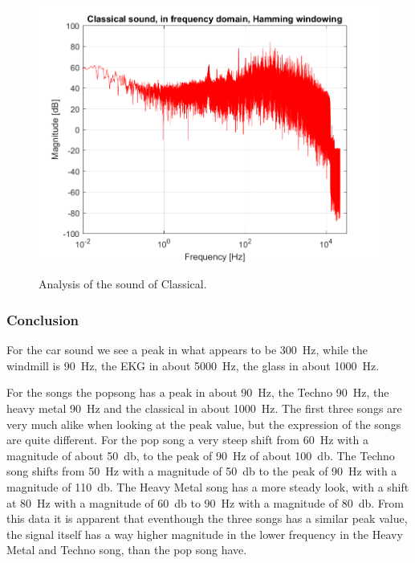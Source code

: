 \begin{figure}[htb!]
	{\includegraphics[width=0.45\linewidth]{code/Classical_figure5.png}}
	\caption{Analysis of the sound of Classical.}\label{fig:klassisk}
\end{figure}

\subsubsection{Conclusion}

For the car sound we see a peak in what appears to be \SI{300}{\hertz}, while the windmill is \SI{90}{\hertz}, the EKG in about \SI{5000}{\hertz}, the glass in about \SI{1000}{\hertz}. 

For the songs the popsong has a peak in about \SI{90}{\hertz}, the Techno \SI{90}{\hertz}, the heavy metal \SI{90}{\hertz} and the classical in about \SI{1000}{\hertz}. The first three songs are very much alike when looking at the peak value, but the expression of the songs are quite different. For the pop song a very steep shift from \SI{60}{\hertz} with a magnitude of about \SI{50}{\decibel}, to the peak of \SI{90}{\hertz} of about \SI{100}{\decibel}. The Techno song shifts from \SI{50}{\hertz} with a magnitude of \SI{50}{\decibel} to the peak of \SI{90}{\hertz} with a magnitude of \SI{110}{\decibel}. The Heavy Metal song has a more steady look, with a shift at \SI{80}{\hertz} with a magnitude of \SI{60}{\decibel} to \SI{90}{\hertz} with a magnitude of \SI{80}{\decibel}. From this data it is apparent that eventhough the three songs has a similar peak value, the signal itself has a way higher magnitude in the lower frequency in the Heavy Metal and Techno song, than the pop song have.

